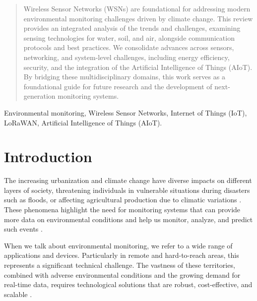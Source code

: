 \documentclass[conference]{IEEEtran}
\begin{document}
\maketitle

\begin{abstract}
Wireless Sensor Networks (WSNs) are foundational for addressing modern environmental monitoring challenges driven by climate change. This review provides an integrated
analysis of the trends and challenges, examining sensing technologies for water, soil, and air, alongside communication protocols and best practices. We consolidate advances across sensors, networking, and system-level challenges, including energy efficiency, security, and the integration of the Artificial Intelligence of Things (AIoT). By bridging these multidisciplinary domains, this work serves as a foundational guide for future research and the development of next-generation monitoring systems.
\end{abstract}

\begin{IEEEkeywords}
Environmental monitoring, Wireless Sensor Networks, Internet of Things (IoT), LoRaWAN, Artificial Intelligence of Things (AIoT).
\end{IEEEkeywords}

\section{Introduction}
The increasing urbanization and climate change have diverse impacts on different layers of society, threatening individuals in vulnerable situations during disasters such as floods, or affecting agricultural production due to climatic variations \cite{jonkman_2005_global}. These phenomena highlight the need for monitoring systems that can provide more data on environmental conditions and help us monitor, analyze, and predict such events \cite{hall_2014_understanding}.

When we talk about environmental monitoring, we refer to a wide range of applications and devices. Particularly in remote and hard-to-reach areas, this represents a significant technical challenge. The vastness of these territories, combined with adverse environmental conditions and the growing demand for real-time data, requires technological solutions that are robust, cost-effective, and scalable \cite{chen_2013_natural, yellampalli_2021_wireless }.
\end{document}
